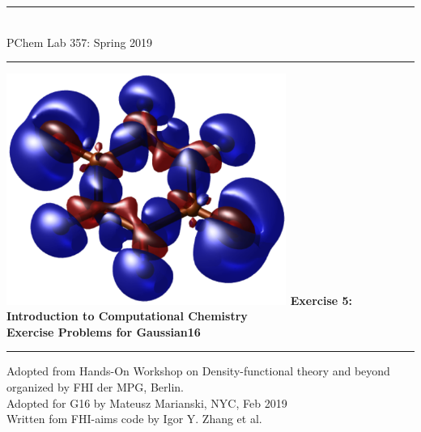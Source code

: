 \documentclass[nobib,nofonts,nols,nohyper]{tufte-handout}
\begin{document}

\thispagestyle{empty}
\begin{fullwidth}
  \begin{center}\huge\bfseries
    \rule{1.5\textwidth}{1pt}
    \\
    PChem Lab 357: Spring 2019 
    \\
    \vspace{0.5cm}
    \rule{1.5\textwidth}{1pt}
  \end{center}
  \vfill
  \begin{center}\LARGE\bfseries
    \includegraphics[height=7.55cm]{pics/cover.png}
    \vfill
    Exercise 5: Introduction to Computational Chemistry\\ 
    Exercise Problems for Gaussian16
  \end{center}
  \vfill
  \begin{center}\large\bfseries
    \rule{1.5\textwidth}{1pt}
    \vfill
    Adopted from Hands-On Workshop on Density-functional theory and beyond organized by FHI der MPG, Berlin.  \\
    Adopted for G16 by Mateusz Marianski, NYC, Feb 2019 \\ 
    Written fom FHI-aims code by Igor Y. Zhang et al.%
  \end{center}
\end{fullwidth}

\clearpage




%


%
\clearpage

\appendix
%

\vfill


%
\end{document}
